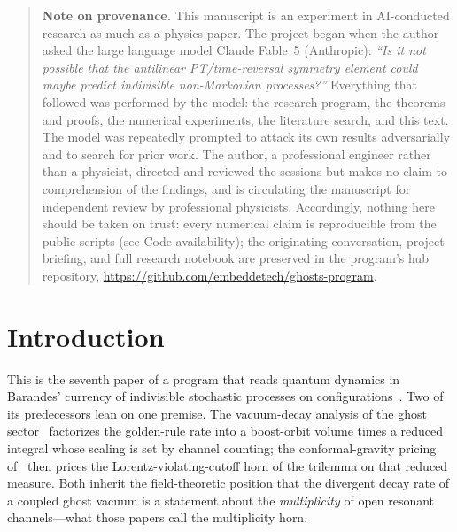 \documentclass[11pt]{article}
\begin{document}
\begin{abstract}
certifies the position-space theory against exact diagonalization at $L=4$
(to $6\times10^{-6}$), runs in production at $L=16$, and then meets an honest
limit that we characterize rather than hide: the
Trotter/truncation floor is non-monotonic in the step
($0.337/0.057/0.231$ at $dt=0.04/0.02/0.01$, $D=40$), and
raising $D$ from $40$ to $64$ moves the floor from $0.057$
to $0.062$---saturation, per the pre-registered decision rule. The
volume-scaling extension is therefore left open at the MPS level;
the verdict itself rests on the exact methods. Conformal-gravity
pricing that leans on the multiplicity premise survives this
test; positions that require a nonperturbative erosion of the
channel sum do not receive support at any scale we can reach.
\end{abstract}

\newpage
\begin{quote}
\small\noindent\textbf{Note on provenance.} This manuscript is an
experiment in AI-conducted research as much as a physics paper. The
project began when the author asked the large language model Claude
Fable~5 (Anthropic): \emph{``Is it not possible that the antilinear
PT/time-reversal symmetry element could maybe predict indivisible
non-Markovian processes?''} Everything that followed was performed by
the model: the research program, the theorems and proofs, the numerical
experiments, the literature search, and this text. The model was
repeatedly prompted to attack its own results adversarially and to
search for prior work. The author, a professional engineer rather than
a physicist, directed and reviewed the sessions but makes no claim to
comprehension of the findings, and is circulating the manuscript for
independent review by professional physicists. Accordingly, nothing
here should be taken on trust: every numerical claim is reproducible
from the public scripts (see Code availability); the originating
conversation, project briefing, and full research notebook are
preserved in the program's hub repository,
\url{https://github.com/embeddetech/ghosts-program}.
\end{quote}

\section{Introduction}
\label{sec:intro}

This is the seventh paper of a program
that reads quantum dynamics in Barandes' currency of indivisible
stochastic processes on
configurations~\cite{Barandes,indivisible,instantaneous,conditioned,choosing,unfolded}. Two of its predecessors lean on one
premise. The vacuum-decay analysis of the ghost
sector~\cite{instantaneous} factorizes the golden-rule rate into a
boost-orbit volume times a reduced integral whose scaling is set
by channel counting; the conformal-gravity pricing
of~\cite{choosing} then prices the Lorentz-violating-cutoff horn
of the trilemma on that reduced measure. Both inherit the
field-theoretic position that the divergent decay rate of a
coupled ghost vacuum is a statement about the \emph{multiplicity}
of open resonant channels---what those papers call the
multiplicity horn.
\end{document}
